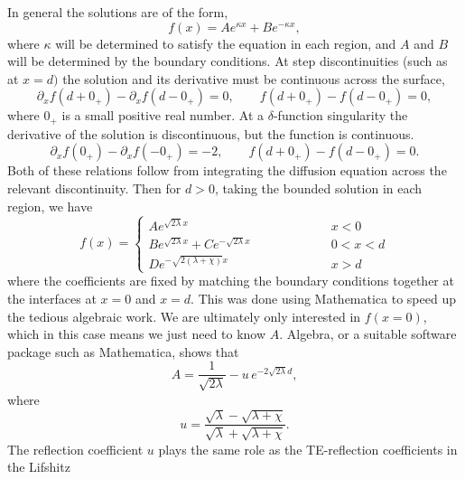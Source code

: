 In general the solutions are of the form, 
\begin{equation}
  f(x) = A e^{\kappa x} + B e^{-\kappa x},
\end{equation}
where $\kappa$ will be determined to satisfy the equation in each region, and $A$ and $B$ will be determined by 
the boundary conditions.
At step discontinuities (such as at $x=d)$ the solution and its derivative must be continuous across the surface,
    \begin{equation}
      \partial_xf(d+0_+) - \partial_x f(d-0_+) = 0, \qquad f(d+0_+)-f(d-0_+) = 0,  
    \end{equation}
    where $0_+$ is a small positive real number.
At a $\delta$-function singularity the derivative of the solution is discontinuous, but the function
is continuous.
    \begin{equation}
      \partial_xf(0_+) -\partial_x f(-0_+) = -2 , \qquad f(d+0_+)-f(d-0_+) = 0.
    \end{equation}
Both of these relations follow from integrating the diffusion equation across the relevant discontinuity.  
Then for $d>0$, taking the bounded solution in each region, we have 
\begin{equation}
  f(x) =\left\{ 
    \begin{array}{lcr}  A e^{\sqrt{2\lambda} x} & \hspace{2cm} & x<0\\
      B e^{\sqrt{2\lambda}x} + Ce^{-\sqrt{2\lambda}x} & \hspace{2cm} & 0<x<d\\
      D e^{-\sqrt{2(\lambda+\chi)}x} & \hspace{2cm} & x>d
    \end{array}
  \right.
\end{equation}
where the coefficients are fixed by matching the boundary conditions together at the interfaces at
$x=0$ and $x=d$.  This was done using Mathematica to speed up the tedious algebraic work.  
We are ultimately only interested in $f(x=0)$, which in this case means we just need to know $A$.
Algebra, or a suitable software package such as Mathematica, shows that 
\begin{equation}
  A = \frac{1}{\sqrt{2\lambda}} - u\,e^{-2\sqrt{2\lambda}d},
\end{equation}
where
\begin{equation}
  u = \frac{\sqrt{\lambda} -\sqrt{\lambda+\chi}}{\sqrt{\lambda} + \sqrt{\lambda+\chi}}.
\end{equation}
The reflection coefficient $u$ plays the same role as the TE-reflection coefficients in the Lifshitz 
